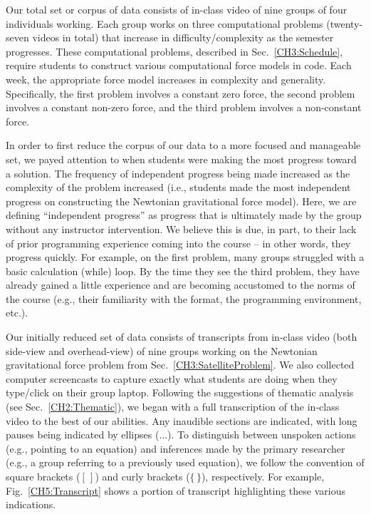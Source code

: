 \documentclass{msuphddissertation}
\begin{document}
\begin{doublespace}
Our total set or corpus of data consists of in-class video of nine groups of four individuals working.  Each group works on three computational problems (twenty-seven videos in total) that increase in difficulty/complexity as the semester progresses.  These computational problems, described in Sec.~\ref{CH3:Schedule}, require students to construct various computational force models in code.  Each week, the appropriate force model increases in complexity and generality.  Specifically, the first problem involves a constant zero force, the second problem involves a constant non-zero force, and the third problem involves a non-constant force.

In order to first reduce the corpus of our data to a more focused and manageable set, we payed attention to when students were making the most progress toward a solution.  The frequency of independent progress being made increased as the complexity of the problem increased (i.e., students made the most independent progress on constructing the Newtonian gravitational force model).  Here, we are defining ``independent progress'' as progress that is ultimately made by the group without any instructor intervention.  We believe this is due, in part, to their lack of prior programming experience coming into the course -- in other words, they progress quickly.  For example, on the first problem, many groups struggled with a basic calculation (while) loop.  By the time they see the third problem, they have already gained a little experience and are becoming accustomed to the norms of the course (e.g., their familiarity with the format, the programming environment, etc.).

Our initially reduced set of data consists of transcripts from in-class video (both side-view and overhead-view) of nine groups working on the Newtonian gravitational force problem from Sec.~\ref{CH3:SatelliteProblem}.  We also collected computer screencasts to capture exactly what students are doing when they type/click on their group laptop.  Following the suggestions of thematic analysis (see Sec.~\ref{CH2:Thematic}), we began with a full transcription of the in-class video to the best of our abilities.  Any inaudible sections are indicated, with long pauses being indicated by ellipses ($\ldots$).  To distinguish between unspoken actions (e.g., pointing to an equation) and inferences made by the primary researcher (e.g., a group referring to a previously used equation), we follow the convention of square brackets ($[\,]$) and curly brackets ($\{\,\}$), respectively.  For example, Fig.~\ref{CH5:Transcript} shows a portion of transcript highlighting these various indications.


\end{doublespace}
\end{document}
